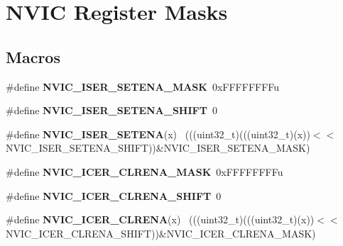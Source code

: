 \hypertarget{group___n_v_i_c___register___masks}{}\section{N\+V\+I\+C Register Masks}
\label{group___n_v_i_c___register___masks}
\subsection*{Macros}
\begin{DoxyCompactItemize}
\item 
\hypertarget{group___n_v_i_c___register___masks_ga7e67471c208e3986c0cdd8e7e1319a30}{}\#define {\bfseries N\+V\+I\+C\+\_\+\+I\+S\+E\+R\+\_\+\+S\+E\+T\+E\+N\+A\+\_\+\+M\+A\+S\+K}~0x\+F\+F\+F\+F\+F\+F\+F\+Fu\label{group___n_v_i_c___register___masks_ga7e67471c208e3986c0cdd8e7e1319a30}

\item 
\hypertarget{group___n_v_i_c___register___masks_ga9965b5df5f4c6c8d3a1c8e89d03d9489}{}\#define {\bfseries N\+V\+I\+C\+\_\+\+I\+S\+E\+R\+\_\+\+S\+E\+T\+E\+N\+A\+\_\+\+S\+H\+I\+F\+T}~0\label{group___n_v_i_c___register___masks_ga9965b5df5f4c6c8d3a1c8e89d03d9489}

\item 
\hypertarget{group___n_v_i_c___register___masks_gac70bcd8b1faa97c22828b5191e806522}{}\#define {\bfseries N\+V\+I\+C\+\_\+\+I\+S\+E\+R\+\_\+\+S\+E\+T\+E\+N\+A}(x)                                        ~(((uint32\+\_\+t)(((uint32\+\_\+t)(x))$<$$<$N\+V\+I\+C\+\_\+\+I\+S\+E\+R\+\_\+\+S\+E\+T\+E\+N\+A\+\_\+\+S\+H\+I\+F\+T))\&N\+V\+I\+C\+\_\+\+I\+S\+E\+R\+\_\+\+S\+E\+T\+E\+N\+A\+\_\+\+M\+A\+S\+K)\label{group___n_v_i_c___register___masks_gac70bcd8b1faa97c22828b5191e806522}

\item 
\hypertarget{group___n_v_i_c___register___masks_gad8da511197e454095edbfeb501e8b2f5}{}\#define {\bfseries N\+V\+I\+C\+\_\+\+I\+C\+E\+R\+\_\+\+C\+L\+R\+E\+N\+A\+\_\+\+M\+A\+S\+K}~0x\+F\+F\+F\+F\+F\+F\+F\+Fu\label{group___n_v_i_c___register___masks_gad8da511197e454095edbfeb501e8b2f5}

\item 
\hypertarget{group___n_v_i_c___register___masks_ga35b241c6ab2dbf18cf15503076dcb9a8}{}\#define {\bfseries N\+V\+I\+C\+\_\+\+I\+C\+E\+R\+\_\+\+C\+L\+R\+E\+N\+A\+\_\+\+S\+H\+I\+F\+T}~0\label{group___n_v_i_c___register___masks_ga35b241c6ab2dbf18cf15503076dcb9a8}

\item 
\hypertarget{group___n_v_i_c___register___masks_ga3e88bf73edea1bb19a921edcffc6c52e}{}\#define {\bfseries N\+V\+I\+C\+\_\+\+I\+C\+E\+R\+\_\+\+C\+L\+R\+E\+N\+A}(x)                                        ~(((uint32\+\_\+t)(((uint32\+\_\+t)(x))$<$$<$N\+V\+I\+C\+\_\+\+I\+C\+E\+R\+\_\+\+C\+L\+R\+E\+N\+A\+\_\+\+S\+H\+I\+F\+T))\&N\+V\+I\+C\+\_\+\+I\+C\+E\+R\+\_\+\+C\+L\+R\+E\+N\+A\+\_\+\+M\+A\+S\+K)\label{group___n_v_i_c___register___masks_ga3e88bf73edea1bb19a921edcffc6c52e}


\end{DoxyCompactItemize}

